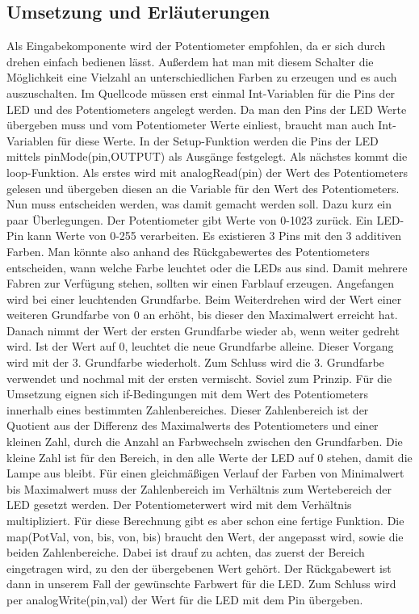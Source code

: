 \subsection{Umsetzung und Erläuterungen}
Als Eingabekomponente wird der Potentiometer empfohlen, da er sich durch drehen einfach bedienen lässt. Außerdem hat man mit diesem Schalter die Möglichkeit eine Vielzahl an unterschiedlichen Farben zu erzeugen und es auch auszuschalten. 
Im Quellcode müssen erst einmal Int-Variablen für die Pins der LED und des Potentiometers angelegt werden. Da man den Pins der LED Werte übergeben muss und vom Potentiometer Werte einliest, braucht man auch Int-Variablen für diese Werte.
In der Setup-Funktion werden die Pins der LED mittels pinMode(pin,OUTPUT) als Ausgänge festgelegt.
Als nächstes kommt die loop-Funktion. Als erstes wird mit analogRead(pin) der Wert des Potentiometers gelesen und übergeben diesen an die Variable für den Wert des Potentiometers.
Nun muss entscheiden werden, was damit gemacht werden soll. Dazu kurz ein paar Überlegungen. Der Potentiometer gibt Werte von 0-1023 zurück. Ein LED-Pin kann Werte von 0-255 verarbeiten. Es existieren 3 Pins mit den 3 additiven Farben. Man könnte also anhand des Rückgabewertes des Potentiometers entscheiden, wann welche Farbe leuchtet oder die LEDs aus sind. Damit mehrere Fabren zur Verfügung stehen, sollten wir einen Farblauf erzeugen. Angefangen wird bei einer leuchtenden Grundfarbe. Beim Weiterdrehen wird der Wert einer weiteren Grundfarbe von 0 an erhöht, bis dieser den Maximalwert erreicht hat. Danach nimmt der Wert der ersten Grundfarbe wieder ab, wenn weiter gedreht wird. Ist der Wert auf 0, leuchtet die neue Grundfarbe alleine. Dieser Vorgang wird mit der 3. Grundfarbe wiederholt. Zum Schluss wird die 3. Grundfarbe verwendet und nochmal mit der ersten vermischt.
Soviel zum Prinzip. Für die Umsetzung eignen sich if-Bedingungen mit dem Wert des Potentiometers innerhalb eines bestimmten Zahlenbereiches. Dieser Zahlenbereich ist der Quotient aus der Differenz des Maximalwerts des Potentiometers und einer kleinen Zahl, durch die Anzahl an Farbwechseln zwischen den Grundfarben. Die kleine Zahl ist für den Bereich, in den alle Werte der LED auf 0 stehen, damit die Lampe aus bleibt. Für einen gleichmäßigen Verlauf der Farben von Minimalwert bis Maximalwert muss der Zahlenbereich im Verhältnis zum Wertebereich der LED gesetzt werden. Der Potentiometerwert wird mit dem Verhältnis multipliziert. Für diese Berechnung gibt es aber schon eine fertige Funktion. Die map(PotVal, von, bis, von, bis) braucht den Wert, der angepasst wird, sowie die beiden Zahlenbereiche. Dabei ist drauf zu achten, das zuerst der Bereich eingetragen wird, zu den der übergebenen Wert gehört. Der Rückgabewert ist dann in unserem Fall der gewünschte Farbwert für die LED.
Zum Schluss wird per analogWrite(pin,val) der Wert für die LED mit dem Pin übergeben. 


